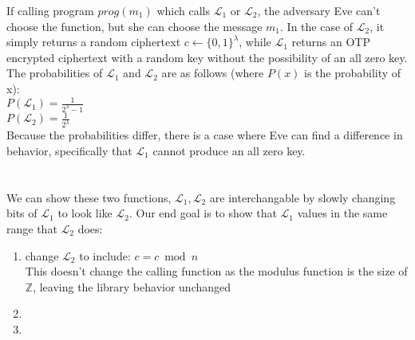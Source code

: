 \documentclass[10pt,letterpaper]{article}
\begin{document}
	If calling program $prog(m_1)$ which calls $\mathcal{L}_1$ or 
	$\mathcal{L}_2$, the adversary Eve can't choose the function, but she
	can choose the message $m_1$. In the case of $\mathcal{L}_2$, it simply
	returns a random ciphertext $c \leftarrow \{0,1\}^\lambda$, while
	$\mathcal{L}_1$ returns an OTP encrypted ciphertext with a random key
	without the possibility of an all zero key. The probabilities of 
	$\mathcal{L}_1$ and $\mathcal{L}_2$ are as follows (where $P(x)$ is the
	probability of x):\\

	\noindent$P(\mathcal{L}_1) = \frac{1}{2^\lambda-1}$\\
	$P(\mathcal{L}_2) = \frac{1}{2^\lambda}$\\

	Because the probabilities differ, there is a case where Eve can find a
	difference in behavior, specifically that $\mathcal{L}_1$ cannot
	produce an all zero key. 

\section{}
	We can show these two functions, $\mathcal{L}_1, \mathcal{L}_2$ are 
	interchangable by slowly changing bits of $\mathcal{L}_1$ to look like
	$\mathcal{L}_2$. Our end goal is to show that $\mathcal{L}_1$
	values in the same range that $\mathcal{L}_2$ does:

	\begin{enumerate}
		\item change $\mathcal{L}_2$ to include: $c = c \bmod n$\\
			This doesn't change the calling function as the modulus
			function is the size of $\mathbb{Z}$, leaving the
			library behavior unchanged
		\item 
		\item 
	\end{enumerate}

	

\section{}
\end{document}
